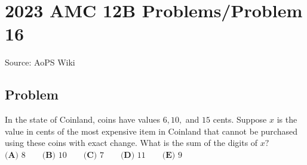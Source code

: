 \documentclass[12pt]{article}
\begin{document}
\section*{{2023 AMC 12B Problems/Problem 16}}
Source: AoPS Wiki

\subsection*{Problem}
In the state of Coinland, coins have values $6,10,$ and $15$ cents. Suppose $x$ is the value in cents of the most expensive item in Coinland that cannot be purchased using these coins with exact change. What is the sum of the digits of $x?$ $\textbf{(A) }8\qquad\textbf{(B) }10\qquad\textbf{(C) }7\qquad\textbf{(D) }11\qquad\textbf{(E) }9$
\end{document}
